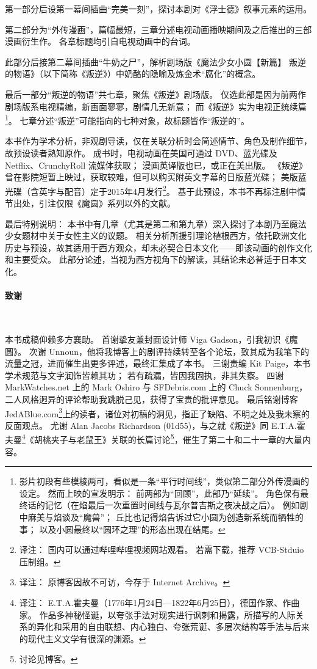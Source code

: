 第一部分后设第一幕间插曲“完美一刻”，探讨本剧对《浮士德》叙事元素的运用。

第二部分为“外传漫画”，篇幅最短，三章分述电视动画播映期间及之后推出的三部漫画衍生作。
各章标题均引自电视动画中的台词。

此部分后接第二幕间插曲“牛奶之尸”，解析剧场版《魔法少女小圆【新篇】 叛逆的物语》（以下简称《叛逆》）中奶酪的隐喻及炼金术“腐化”的概念。

最后一部分“叛逆的物语”共七章，聚焦《叛逆》剧场版。
仅选此部是因为前两作剧场版系电视精编，新画面寥寥，剧情几无新意；
而《叛逆》实为电视正统续篇\footnote{%
    影片初段有些模棱两可，看似是一条“平行时间线”，类似第二部分外传漫画的设定。
    然而上映的宣发明示：
    前两部为“回顾”，此部乃“延续”。
    角色保有最终话的记忆（在焰最后一次重置时间线与瓦尔普吉斯之夜决战之后）。
    例如剧中麻美与焰谈及“魔兽”；
    丘比也记得焰告诉过它小圆为创造新系统而牺牲的事；
    以及小圆最终以“圆环之理”的形态出现在结尾。
}\cite{ref8}。
七章分述“叛逆”可能指向的七种对象，故标题皆作“叛逆的\underline{\makebox[1cm]{}}”。

本书作为学术分析，非观剧导读，仅在关联分析时会简述情节、角色及制作细节，故预设读者熟知原作。
成书时，电视动画在美国可通过 DVD、蓝光碟及 Netflix、CrunchyRoll 流媒体获取；
漫画英译版也已，或正在美出版。
《叛逆》曾在影院短暂上映过，获取较难，但可以购买附英文字幕的日版蓝光碟；
美版蓝光碟（含英字与配音）定于2015年4月发行\footnote{%
    译注：
    国内可以通过哔哩哔哩视频网站观看。
    若需下载，推荐 VCB-Stduio 压制组。
}。
基于此预设，本书不再标注剧中情节出处，引注仅限《魔圆》系列以外的文献。

最后特别说明：
本书中有几章（尤其是第二和第九章）深入探讨了本剧乃至魔法少女题材中关于女性主义的议题。
相关分析所援引理论植根西方，依托欧洲文化历史与预设，故其适用于西方观众，却未必契合日本文化——即该动画的创作文化和主要受众。
此部分论述，当视为西方视角下的解读，其结论未必普适于日本文化。
\paragraph{致谢}~{}

本书成稿仰赖多方襄助。
首谢挚友兼封面设计师 Viga Gadson，引我初识《魔圆》。
次谢 Unnoun，他将我博客上的剧评持续转至各个论坛，致其成为我笔下的流量之冠，进而催生出更多评述，最终汇集成了本书。
三谢责编 Kit Paige，本书学术规范与文字润饰皆赖其功；
若有疏漏，皆因我固执，非其失察。
四谢 MarkWatches.net 上的 Mark Oshiro 与 SFDebris.com 上的 Chuck Sonnenburg，二人风格迥异的评论帮助我跳脱己见，获得了宝贵的批评意见。
最后铭谢博客 JedABlue.com\footnote{%
    译注：
    原博客因故不可访，今存于 Internet Archive。
}上的读者，诸位对初稿的洞见，指正了缺陷、不明之处及我未察的反面观点。
尤谢 Alan Jacobs Richardson (01d55)，与之就《叛逆》同 E.T.A.霍夫曼\footnote{%
    译注：
    E.T.A.霍夫曼（1776年1月24日—1822年6月25日），德国作家、作曲家。
    作品多神秘怪诞，以夸张手法对现实进行讽刺和揭露，所描写的人际关系的异化和采用的自由联想、内心独白、夸张荒诞、多层次结构等手法与后来的现代主义文学有很深的渊源。
}《胡桃夹子与老鼠王》关联的长篇讨论\footnote{%
    讨论见博客。
}\cite{ref9}，催生了第二十和二十一章的大量内容。
